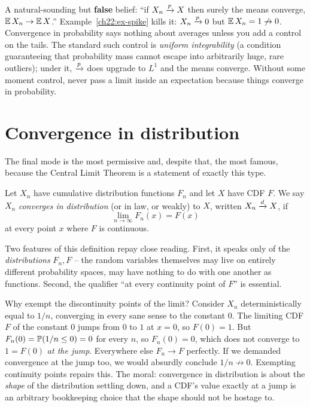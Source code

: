 \begin{trapbox}
A natural-sounding but \textbf{false} belief: ``if $X_n\pto X$ then surely the means
converge, $\E X_n \to \E X$.'' Example~\ref{ch22:ex-spike} kills it: $X_n\pto0$ but
$\E X_n = 1 \not\to 0$. Convergence in probability says nothing about averages
unless you add a control on the tails. The standard such control is \emph{uniform
integrability} (a condition guaranteeing that probability mass cannot escape into
arbitrarily huge, rare outliers); under it, $\pto$ does upgrade to $L^1$ and the means
converge. Without some moment control, never pass a limit inside an expectation
because things converge in probability.
\end{trapbox}

\section{Convergence in distribution}
\label{ch22:dist}

The final mode is the most permissive and, despite that, the most famous, because the
Central Limit Theorem is a statement of exactly this type.

\begin{definition}
\label{ch22:def-dist}
Let $X_n$ have cumulative distribution functions $F_n$ and let $X$ have CDF $F$. We
say $X_n$ \emph{converges in distribution} (or in law, or weakly) to $X$, written
$X_n \dto X$, if
\[
  \lim_{n\to\infty} F_n(x) = F(x)
\]
at every point $x$ where $F$ is continuous.
\end{definition}

Two features of this definition repay close reading. First, it speaks only of the
\emph{distributions} $F_n, F$ -- the random variables themselves may live on entirely
different probability spaces, may have nothing to do with one another as functions.
Second, the qualifier ``at every continuity point of $F$'' is essential.

\begin{whybox}
Why exempt the discontinuity points of the limit? Consider $X_n$ deterministically
equal to $1/n$, converging in every sane sense to the constant $0$. The limiting CDF
$F$ of the constant $0$ jumps from $0$ to $1$ at $x=0$, so $F(0)=1$. But
$F_n(0)=\P(1/n\le0)=0$ for every $n$, so $F_n(0)=0$, which does not converge to $1=F(0)$ \emph{at the jump}.
Everywhere else $F_n\to F$ perfectly. If we demanded convergence at the jump too, we
would absurdly conclude $1/n\not\to0$. Exempting continuity points repairs this. The
moral: convergence in distribution is about the \emph{shape} of the distribution
settling down, and a CDF's value exactly at a jump is an arbitrary bookkeeping choice
that the shape should not be hostage to.
\end{whybox}

